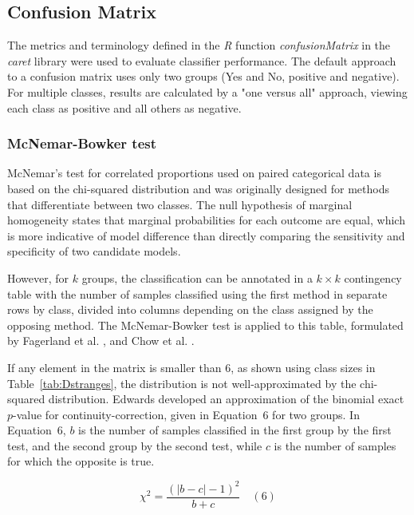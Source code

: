 \let\LaTeXcline\cline\documentclass[sn-mathphys-num]{sn-jnl}\let\cline\LaTeXcline
\begin{document}
\subsection{Confusion Matrix}

The metrics and terminology defined in the \textit{R} function \textit{confusionMatrix} in the \textit{caret} library \cite{Kuhn2007, kuhn2008building} were used to evaluate classifier performance. The default approach to a confusion matrix uses only two groups (Yes and No, positive and negative). For multiple classes, results are calculated by a "one versus all" approach, viewing each class as positive and all others as negative.

\subsubsection{McNemar-Bowker test}

McNemar’s test for correlated proportions used on paired categorical data is based on the chi-squared distribution and was originally designed for methods that differentiate between two classes. The null hypothesis of marginal homogeneity states that marginal probabilities for each outcome are equal, which is more indicative of model difference than directly comparing the sensitivity and specificity of two candidate models.

However, for $k$ groups, the classification can be annotated
in a $k \times k$ contingency table with the number of samples classified using the first method in separate rows by class, divided into columns depending on the class assigned by the opposing method. The McNemar-Bowker test is applied to this table, formulated by Fagerland et al. \cite{fagerland2017statistical}, and Chow et al. \cite{chow2018sample}.

If any element in the matrix is smaller than $6$, as shown using class sizes in Table~\ref{tab:Dstranges}, the distribution is not well-approximated by the chi-squared distribution. Edwards \cite{edwards1948note} developed an approximation of the binomial exact $p$-value for continuity-correction, given in Equation~6 for two groups. In Equation~6, $b$ is the number of samples classified in the first group by the first test, and the second group by the second test, while $c$ is the number of samples for which the opposite is true.
 
\begin{equation}
	\chi^{2}=\frac{(|b-c|-1)^{2}}{b+c}
	\quad\left(6\right)
\end{equation}
\end{document}
